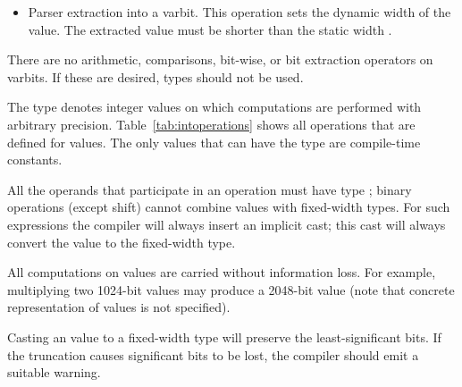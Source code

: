 \documentclass[12pt]{article}
\begin{document}
\begin{itemize}
\item Parser extraction into a varbit. This operation sets the dynamic
  width of the value.  The extracted value must be shorter than the
  static width \W.
\end{itemize}

There are no arithmetic, comparisons, bit-wise, or bit extraction
operators on varbits.  If these are desired,  types
should not be used.


The type \infint{} denotes integer values on which computations are
performed with arbitrary precision.  Table~\ref{tab:intoperations}
shows all operations that are defined for \infint{} values.  The only
values that can have the type \infint{} are compile-time constants.

All the operands that participate in an operation must have type
\infint{}; binary operations (except shift) cannot combine \infint{}
values with fixed-width types.  For such expressions the compiler will
always insert an implicit cast; this cast will always convert the
\infint{} value to the fixed-width type.

All computations on \infint{} values are carried without information
loss.  For example, multiplying two 1024-bit values may produce a
2048-bit value (note that concrete representation of \infint{} values
is not specified).

Casting an \infint{} value to a fixed-width type will preserve the
least-significant bits.  If the truncation causes significant bits to
be lost, the compiler should emit a suitable warning. 
\end{document}

